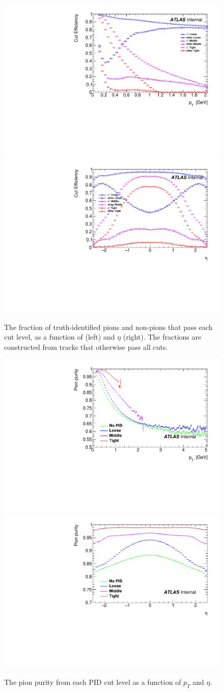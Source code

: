 \begin{figure}[t]
\includegraphics[width=.49\linewidth]{pid_eff_pt.pdf}
\includegraphics[width=.49\linewidth]{pid_eff_eta.pdf}\\
\caption{The fraction of truth-identified pions and non-pions that pass each \pid cut level, as a function of \pt (left) and $\eta$ (right). The fractions are constructed from tracks that otherwise pass all cuts.}
\label{fig:pid_eff}
\end{figure}

\begin{figure}[t]
\begin{minipage}[t]{1.0\textwidth}
\centering
\includegraphics[width=.49\linewidth]{pid_purity_pt.pdf}
\includegraphics[width=.49\linewidth]{pid_purity_eta.pdf}\\
\end{minipage}
\caption{The pion purity from each PID cut level as a function of $p_{T}$ and $\eta$.}
\label{fig:pid_purity}
\end{figure}

